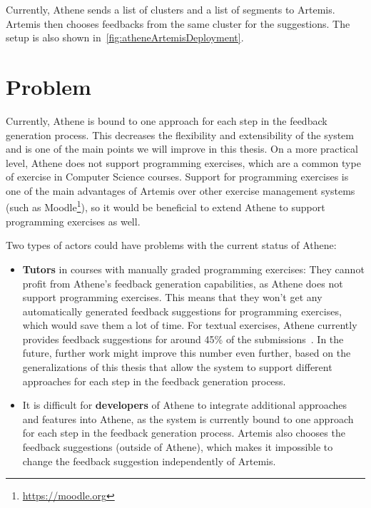 Currently, Athene sends a list of clusters and a list of segments to Artemis. Artemis then chooses feedbacks from the same cluster for the suggestions. The setup is also shown in~\cref{fig:atheneArtemisDeployment}.


\section*{Problem}

Currently, Athene is bound to one approach for each step in the feedback generation process. This decreases the flexibility and extensibility of the system and is one of the main points we will improve in this thesis.
On a more practical level, Athene does not support programming exercises, which are a common type of exercise in Computer Science courses. Support for programming exercises is one of the main advantages of Artemis over other exercise management systems (such as Moodle\footnote{\url{https://moodle.org}}), so it would be beneficial to extend Athene to support programming exercises as well.

Two types of actors could have problems with the current status of Athene:
\begin{itemize}
    \item \textbf{Tutors} in courses with manually graded programming exercises: They cannot profit from Athene's feedback generation capabilities, as Athene does not support programming exercises. This means that they won't get any automatically generated feedback suggestions for programming exercises, which would save them a lot of time.
    For textual exercises, Athene currently provides feedback suggestions for around 45\% of the submissions~\cite{cofee2}. In the future, further work might improve this number even further, based on the generalizations of this thesis that allow the system to support different approaches for each step in the feedback generation process.
    \item It is difficult for \textbf{developers} of Athene to integrate additional approaches and features into Athene, as the system is currently bound to one approach for each step in the feedback generation process. Artemis also chooses the feedback suggestions (outside of Athene), which makes it impossible to change the feedback suggestion independently of Artemis.
\end{itemize}

